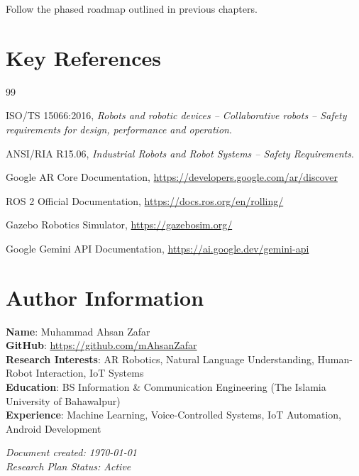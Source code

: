 \documentclass[12pt,a4paper,oneside]{book}
\begin{document}
Follow the phased roadmap outlined in previous chapters.

\newpage

\appendix

\chapter{Key References}

\begin{thebibliography}{99}

 ISO/TS 15066:2016, \textit{Robots and robotic devices -- Collaborative robots -- Safety requirements for design, performance and operation}.

 ANSI/RIA R15.06, \textit{Industrial Robots and Robot Systems -- Safety Requirements}.

 Google AR Core Documentation, \url{https://developers.google.com/ar/discover}

 ROS 2 Official Documentation, \url{https://docs.ros.org/en/rolling/}

 Gazebo Robotics Simulator, \url{https://gazebosim.org/}

 Google Gemini API Documentation, \url{https://ai.google.dev/gemini-api}

\end{thebibliography}

\chapter{Author Information}

\begin{tcolorbox}[colback=lightblue, colframe=darkblue]
\textbf{Name}: Muhammad Ahsan Zafar\\
\textbf{GitHub}: \url{https://github.com/mAhsanZafar}\\
\textbf{Research Interests}: AR Robotics, Natural Language Understanding, Human-Robot Interaction, IoT Systems\\
\textbf{Education}: BS Information \& Communication Engineering (The Islamia University of Bahawalpur)\\
\textbf{Experience}: Machine Learning, Voice-Controlled Systems, IoT Automation, Android Development
\end{tcolorbox}

\vfill

\begin{center}
\textit{Document created: \today}\\
\textit{Research Plan Status: Active}
\end{center}
\end{document}
